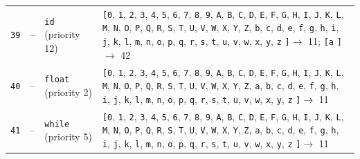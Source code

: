 \documentclass[11pt,a4paper]{article}
\newcommand{\opensymbolset}{\texttt{[}}
\newcommand{\closesymbolset}{\texttt{]}}
\begin{document}
\begin{landscape}
\begin{longtable}{
    >{\centering\arraybackslash}p{0.8cm}
    >{\centering\arraybackslash}p{0.7cm}
    >{\raggedright\arraybackslash}p{3.7cm}
    >{\raggedright\arraybackslash}p{18.1cm}
}
\texttt{39} & -- & \texttt{id} (priority 12) & \opensymbolset \texttt{0}, \texttt{1}, \texttt{2}, \texttt{3}, \texttt{4}, \texttt{5}, \texttt{6}, \texttt{7}, \texttt{8}, \texttt{9}, \texttt{A}, \texttt{B}, \texttt{C}, \texttt{D}, \texttt{E}, \texttt{F}, \texttt{G}, \texttt{H}, \texttt{I}, \texttt{J}, \texttt{K}, \texttt{L}, \texttt{M}, \texttt{N}, \texttt{O}, \texttt{P}, \texttt{Q}, \texttt{R}, \texttt{S}, \texttt{T}, \texttt{U}, \texttt{V}, \texttt{W}, \texttt{X}, \texttt{Y}, \texttt{Z}, \texttt{b}, \texttt{c}, \texttt{d}, \texttt{e}, \texttt{f}, \texttt{g}, \texttt{h}, \texttt{i}, \texttt{j}, \texttt{k}, \texttt{l}, \texttt{m}, \texttt{n}, \texttt{o}, \texttt{p}, \texttt{q}, \texttt{r}, \texttt{s}, \texttt{t}, \texttt{u}, \texttt{v}, \texttt{w}, \texttt{x}, \texttt{y}, \texttt{z} \closesymbolset $\to$ 11; \opensymbolset \texttt{a} \closesymbolset $\to$ 42 \\
\texttt{40} & -- & \texttt{float} (priority 2) & \opensymbolset \texttt{0}, \texttt{1}, \texttt{2}, \texttt{3}, \texttt{4}, \texttt{5}, \texttt{6}, \texttt{7}, \texttt{8}, \texttt{9}, \texttt{A}, \texttt{B}, \texttt{C}, \texttt{D}, \texttt{E}, \texttt{F}, \texttt{G}, \texttt{H}, \texttt{I}, \texttt{J}, \texttt{K}, \texttt{L}, \texttt{M}, \texttt{N}, \texttt{O}, \texttt{P}, \texttt{Q}, \texttt{R}, \texttt{S}, \texttt{T}, \texttt{U}, \texttt{V}, \texttt{W}, \texttt{X}, \texttt{Y}, \texttt{Z}, \texttt{a}, \texttt{b}, \texttt{c}, \texttt{d}, \texttt{e}, \texttt{f}, \texttt{g}, \texttt{h}, \texttt{i}, \texttt{j}, \texttt{k}, \texttt{l}, \texttt{m}, \texttt{n}, \texttt{o}, \texttt{p}, \texttt{q}, \texttt{r}, \texttt{s}, \texttt{t}, \texttt{u}, \texttt{v}, \texttt{w}, \texttt{x}, \texttt{y}, \texttt{z} \closesymbolset $\to$ 11 \\
\texttt{41} & -- & \texttt{while} (priority 5) & \opensymbolset \texttt{0}, \texttt{1}, \texttt{2}, \texttt{3}, \texttt{4}, \texttt{5}, \texttt{6}, \texttt{7}, \texttt{8}, \texttt{9}, \texttt{A}, \texttt{B}, \texttt{C}, \texttt{D}, \texttt{E}, \texttt{F}, \texttt{G}, \texttt{H}, \texttt{I}, \texttt{J}, \texttt{K}, \texttt{L}, \texttt{M}, \texttt{N}, \texttt{O}, \texttt{P}, \texttt{Q}, \texttt{R}, \texttt{S}, \texttt{T}, \texttt{U}, \texttt{V}, \texttt{W}, \texttt{X}, \texttt{Y}, \texttt{Z}, \texttt{a}, \texttt{b}, \texttt{c}, \texttt{d}, \texttt{e}, \texttt{f}, \texttt{g}, \texttt{h}, \texttt{i}, \texttt{j}, \texttt{k}, \texttt{l}, \texttt{m}, \texttt{n}, \texttt{o}, \texttt{p}, \texttt{q}, \texttt{r}, \texttt{s}, \texttt{t}, \texttt{u}, \texttt{v}, \texttt{w}, \texttt{x}, \texttt{y}, \texttt{z} \closesymbolset $\to$ 11 \\

\end{longtable}
\end{landscape}
\end{document}
